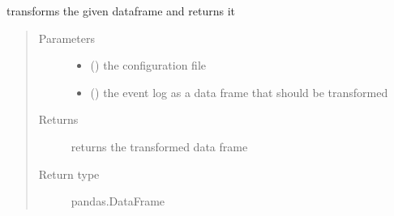 \documentclass[letterpaper,10pt,english]{sphinxmanual}
\begin{document}
\begin{fulllineitems}
\begin{fulllineitems}
\label{\detokenize{event_log_analyzer:event_log_analyzer.adapter.TimestampModifier.transform}}
\sphinxAtStartPar
transforms the given dataframe and returns it
\begin{quote}\begin{description}
\item[{Parameters}] \leavevmode\begin{itemize}
\item {} 
\sphinxAtStartPar
{} () \textendash{} the configuration file

\item {} 
\sphinxAtStartPar
{} () \textendash{} the event log as a data frame that should be transformed

\end{itemize}

\item[{Returns}] \leavevmode
\sphinxAtStartPar
returns the transformed data frame

\item[{Return type}] \leavevmode
\sphinxAtStartPar
pandas.DataFrame

\end{description}\end{quote}

\end{fulllineitems}


\end{fulllineitems}

\end{document}
